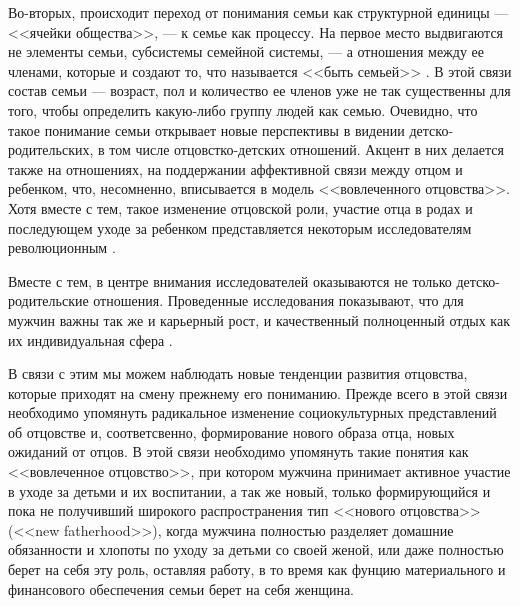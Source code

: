 \documentclass{../../common/thesisbyxetex}
\begin{document}
Во-вторых, происходит переход от понимания семьи как структурной единицы --- <<ячейки общества>>,
--- к семье как процессу. На первое место выдвигаются не элементы семьи, субсистемы семейной
системы, --- а отношения между ее членами, которые и создают то, что называется <<быть семьей>>
\cite{fam}. В этой связи состав семьи --- возраст, пол и количество ее членов уже не так
существенны для того, чтобы определить какую-либо группу людей как семью. Очевидно, что такое
понимание семьи открывает новые перспективы в видении детско-родительских, в том числе
отцовстко-детских отношений. Акцент в них делается также на отношениях, на поддержании аффективной
связи между отцом и ребенком, что, несомненно,  вписывается в модель <<вовлеченного отцовства>>.
Хотя вместе с тем, такое изменение отцовской роли, участие отца в родах и последующем уходе за
ребенком представляется некоторым исследователям
революционным \cite[15]{fatpsy}.

Вместе с тем, в центре внимания исследователей оказываются не только детско-родительские отношения.
Проведенные исследования показывают, что для мужчин важны так же и карьерный рост, и качественный
полноценный отдых как их индивидуальная сфера \cite{mercoh}.

В связи с этим мы можем наблюдать новые тенденции развития отцовства, которые приходят на смену
прежнему его пониманию. Прежде всего в этой связи необходимо упомянуть радикальное изменение
социокультурных представлений об отцовстве и, соответсвенно, формирование нового образа отца, новых
ожиданий от отцов. В этой связи необходимо упомянуть такие понятия как <<вовлеченное отцовство>>,
при котором мужчина принимает активное участие в уходе за детьми и их воспитании, а так же
новый,  только формирующийся и пока не получивший широкого распространения  тип <<нового
отцовства>> (<<new fatherhood>>), когда мужчина полностью разделяет домашние обязанности и хлопоты
по уходу за детьми со своей женой, или даже полностью берет на себя эту роль, оставляя работу, в то
время как фунцию материального и финансового обеспечения семьи берет на себя женщина.
\end{document}
